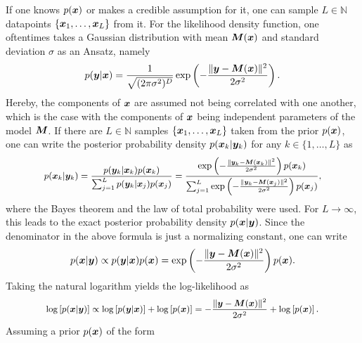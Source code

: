 \documentclass[a4paper,12pt]{report}
\begin{document}
If one knows $p(\bm{x})$ or makes a credible assumption for it, one can sample $L\in \mathbb{N}$ datapoints $\{\bm{x}_{1},\dots,\bm{x}_{L}\}$ from it. For the likelihood density function, one oftentimes takes a Gaussian distribution with mean $\bm{M}(\bm{x})$ and standard deviation $\sigma$ as an Ansatz, namely \begin{equation}
p(\bm{y}|\bm{x}) = \frac{1}{\sqrt{(2\pi\sigma^2)^D}}\exp\left(-\frac{\| \bm{y}-\bm{M}(\bm{x})\|^2}{2\sigma^2}\right).
\end{equation} Hereby, the components of $\bm{x}$ are assumed not being correlated with one another, which is the case with the components of $\bm{x}$ being independent parameters of the model $\bm{M}$. If there are $L \in \mathbb{N}$ samples $\{\bm{x}_{1},\dots,\bm{x}_{L}\}$ taken from the prior $p(\bm{x})$, one can write the posterior probability density $p(\bm{x}_k|\bm{y}_k)$ for any $k \in \{1,\dots,L\}$ as \begin{align}\small\begin{aligned}
p(\bm{x}_{k}|\bm{y}_{k}) = \frac{p(\bm{y}_k|\bm{x}_k)p(\bm{x}_k)}{\sum_{j=1}^L p(\bm{y}_k|\bm{x}_j)p(\bm{x}_j)} = \frac{\exp\left(-\frac{\| \bm{y}_k-\bm{M}(\bm{x}_k)\|^2}{2\sigma^2}\right)p(\bm{x}_k)}{\sum_{j=1}^L \exp\left(-\frac{\| \bm{y}_k-\bm{M}(\bm{x}_j)\|^2}{2\sigma^2}\right)p(\bm{x}_j)},
\end{aligned}\end{align} where the Bayes theorem and the law of total probability were used. For $L\rightarrow \infty$, this leads to the exact posterior probability density $p(\bm{x}|\bm{y})$. Since the denominator in the above formula is just a normalizing constant, one can write \begin{equation}
p(\bm{x}|\bm{y}) \propto p(\bm{y}|\bm{x})p(\bm{x}) = \exp\left(-\frac{\|\bm{y}-\bm{M}(\bm{x})\|^2}{2\sigma^2}\right)p(\bm{x}).
\end{equation} Taking the natural logarithm yields the log-likelihood as \begin{align}\small\begin{aligned}
\log\left[p(\bm{x}|\bm{y})\right] \propto \log\left[p(\bm{y}|\bm{x})\right] + \log\left[p(\bm{x})\right] = -\frac{\|\bm{y}-\bm{M}(\bm{x}) \|^2}{2\sigma^2} + \log\left[p(\bm{x})\right].
\end{aligned}\end{align} Assuming a prior $p(\bm{x})$ of the form \begin{equation}

\end{equation}
\end{document}
